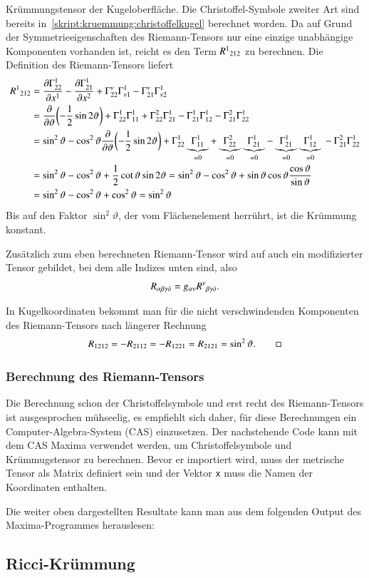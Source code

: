 \begin{beispiel}
Krümmungstensor der Kugeloberfläche.
Die Christoffel-Symbole zweiter Art sind bereits
in~\eqref{skript:kruemmung:christoffelkugel}
berechnet worden.
Da auf Grund der Symmetrieeigenschaften des Riemann-Tensors nur eine
einzige unabhängige Komponenten vorhanden ist, reicht es den
Term $R^1\mathstrut_{212}$ zu berechnen.
Die Definition des Riemann-Tensors liefert
\begin{align*}
R^1\mathstrut_{212}
&=
\frac{\partial \Gamma_{22}^1}{\partial x^1}
-
\frac{\partial \Gamma_{21}^1}{\partial x^2}
+
\Gamma_{22}^\nu
\Gamma_{\nu1}^1
-
\Gamma_{21}^\nu
\Gamma_{\nu2}^1
\\
&=
\frac{\partial}{\partial\vartheta}\biggl(-\frac12\sin2\vartheta\biggr)
+
\Gamma_{22}^1
\Gamma_{11}^1
+
\Gamma_{22}^2
\Gamma_{21}^1
-
\Gamma_{21}^1
\Gamma_{12}^1
-
\Gamma_{21}^2
\Gamma_{22}^1
\\
&=
\sin^2\vartheta - \cos^2\vartheta
\frac{\partial}{\partial\vartheta}\biggl(-\frac12\sin2\vartheta\biggr)
+
\Gamma_{22}^1
\underbrace{\Gamma_{11}^1}_{=0}
+
\underbrace{\Gamma_{22}^2}_{=0}
\underbrace{\Gamma_{21}^1}_{=0}
-
\underbrace{\Gamma_{21}^1}_{=0}
\underbrace{\Gamma_{12}^1}_{=0}
\mathstrut
-
\Gamma_{21}^2
\Gamma_{22}^1
\\
&=
\sin^2\vartheta - \cos^2\vartheta
+
\frac12 \cot \vartheta \sin2\vartheta
=
\sin^2\vartheta - \cos^2\vartheta
+
\sin\vartheta\cos\vartheta\frac{\cos\vartheta}{\sin\vartheta}
\\
&=
\sin^2\vartheta - \cos^2\vartheta
+
\cos^2\vartheta
=
\sin^2\vartheta
\end{align*}
Bis auf den Faktor $\sin^2\vartheta$, der vom Flächenelement herrührt,
ist die Krümmung konstant.
\end{beispiel}

Zusätzlich zum eben berechneten Riemann-Tensor wird auf auch ein
modifizierter Tensor gebildet, bei dem alle Indizes unten sind,
also
\[
R_{\alpha\beta\gamma\delta} = g_{\alpha\nu}R^\nu\mathstrut_{\beta\gamma\delta}.
\]

\begin{beispiel}
In Kugelkoordinaten bekommt man für die nicht verschwindenden Komponenten
des Riemann-Tensors nach längerer Rechnung
\[
R_{1212}
=
-R_{2112}
=
-R_{1221}
=
R_{2121}
=
\sin^2\vartheta.
\qedhere
\]
\end{beispiel}

\subsubsection{Berechnung des Riemann-Tensors}
Die Berechnung schon der Christoffelsymbole und erst recht des
Riemann-Tensors ist ausgesprochen mühseelig, es empfiehlt sich
daher, für diese Berechnungen ein Computer-Algebra-System (CAS) einzusetzen.
Der nachstehende Code kann mit dem CAS Maxima verwendet werden, um
Christoffelsymbole und Krümmugstensor zu berechnen.
Bevor er importiert wird, muss der metrische Tensor als Matrix
definiert sein und der Vektor {\tt x} muss die Namen der Koordinaten
enthalten.



Die weiter oben dargestellten Resultate kann man aus dem folgenden Output
des Maxima-Programmes herauslesen:
{\small

}

\subsection{Ricci-Krümmung}



